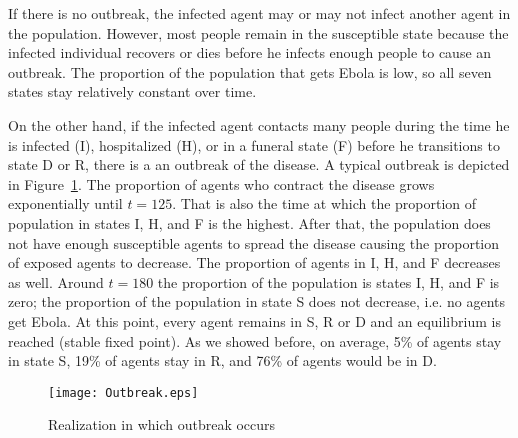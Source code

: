 
If there is no outbreak, the infected agent may or may not infect another agent in the population. However, most people remain in the  susceptible state because the infected individual recovers or dies before he infects enough people to cause an outbreak. The proportion of the population that gets Ebola is low, so all seven states stay relatively constant over time. %


On the other hand, if the infected agent contacts many people during the time he is infected (I), hospitalized (H), or in a funeral state (F) before he transitions to state D or R, there is a an outbreak of the disease. A typical outbreak is depicted in Figure~\ref{fig:Outbreak}. The proportion of agents who contract the disease grows exponentially until $t = 125$. That is also the time at which the proportion of population  in states I, H, and F is the highest. After that, the population does not have enough susceptible agents to spread the disease causing the proportion of exposed agents to decrease. The proportion of agents in I, H, and F decreases as well. Around $t = 180$ the proportion of the population is states I, H, and F is zero; the proportion of the population in state S does not decrease, i.e. no agents get Ebola. At this point, every agent remains in S, R or D and an equilibrium is reached (stable fixed point). As we showed before, on average, 5\% of agents stay in state S, 19\% of agents stay in R, and 76\% of agents would be in D. 
\begin{figure}
\begin{center}
\texttt{[image: Outbreak.eps]}
\end{center}
\caption{Realization in which outbreak occurs}
\label{fig:Outbreak}
\end{figure}

